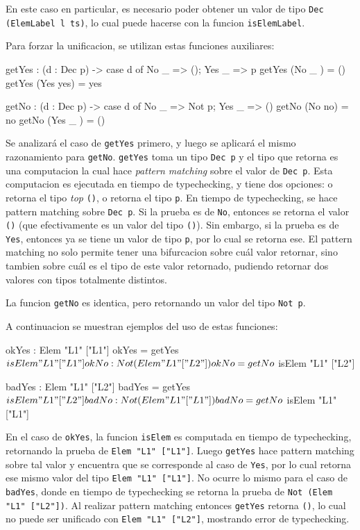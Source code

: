 En este caso en particular, es necesario poder obtener un valor de tipo \texttt{Dec (ElemLabel l ts)}, lo cual puede hacerse con la funcion \texttt{isElemLabel}.

Para forzar la unificacion, se utilizan estas funciones auxiliares:

\begin{code}
getYes : (d : Dec p) -> 
  case d of { No _ => (); Yes _ => p}
getYes (No _ ) = ()
getYes (Yes yes) = yes

getNo : (d : Dec p) -> 
  case d of { No _ => Not p; Yes _ => ()}
getNo (No no) = no
getNo (Yes _ ) = ()
\end{code}

Se analizará el caso de \texttt{getYes} primero, y luego se aplicará el mismo razonamiento para \texttt{getNo}.
\texttt{getYes} toma un tipo \texttt{Dec p} y el tipo que retorna es una computacion la cual hace \textit{pattern matching} sobre el valor de \texttt{Dec p}. Esta computacion es ejecutada en tiempo de typechecking, y tiene dos opciones: o retorna el tipo \textit{top} \texttt{()}, o retorna el tipo \texttt{p}.
En tiempo de typechecking, se hace pattern matching sobre \texttt{Dec p}. Si la prueba es de \texttt{No}, entonces se retorna el valor \texttt{()} (que efectivamente es un valor del tipo \texttt{()}). Sin embargo, si la prueba es de \texttt{Yes}, entonces ya se tiene un valor de tipo \texttt{p}, por lo cual se retorna ese. El pattern matching no solo permite tener una bifurcacion sobre cuál valor retornar, sino tambien sobre cuál es el tipo de este valor retornado, pudiendo retornar dos valores con tipos totalmente distintos.

La funcion \texttt{getNo} es identica, pero retornando un valor del tipo \texttt{Not p}.

A continuacion se muestran ejemplos del uso de estas funciones:

\begin{code}
okYes : Elem "L1" ["L1"]
okYes = getYes $ isElem "L1" ["L1"]

okNo : Not (Elem "L1" ["L2"])
okNo = getNo $ isElem "L1" ["L2"]

badYes : Elem "L1" ["L2"]
badYes = getYes $ isElem "L1" ["L2"]

badNo : Not (Elem "L1" ["L1"])
badNo = getNo $ isElem "L1" ["L1"]
\end{code}

En el caso de \texttt{okYes}, la funcion \texttt{isElem} es computada en tiempo de typechecking, retornando la prueba de \texttt{Elem "L1" ["L1"]}. Luego \texttt{getYes} hace pattern matching sobre tal valor y encuentra que se corresponde al caso de \texttt{Yes}, por lo cual retorna ese mismo valor del tipo \texttt{Elem "L1" ["L1"]}. No ocurre lo mismo para el caso de \texttt{badYes}, donde en tiempo de typechecking se retorna la prueba de \texttt{Not (Elem "L1" ["L2"])}. Al realizar pattern matching entonces \texttt{getYes} retorna \texttt{()}, lo cual no puede ser unificado con \texttt{Elem "L1" ["L2"]}, mostrando error de typechecking.

